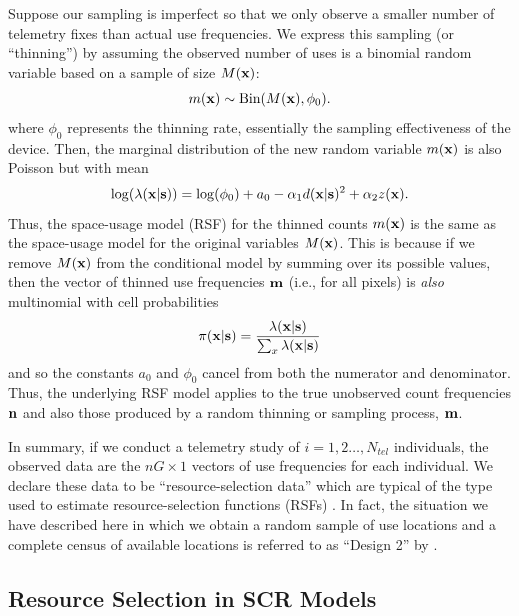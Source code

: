 \documentclass[12pt]{article}
\begin{document}
Suppose our sampling is imperfect so that we only observe a smaller
number of telemetry fixes than actual use
frequencies.
We express this sampling (or ``thinning'') by assuming the observed number of
uses is a binomial random variable based on a sample of size $M({\bf
  x})$:
\[
 m({\bf x}) \sim \mbox{Bin}(M({\bf x}), \phi_{0}).
\]
where $\phi_{0}$
represents the thinning rate, essentially the
sampling effectiveness of the device.
 Then, the marginal distribution of the new random variable $m({\bf x})$ is
 also Poisson
but with mean
\[
 \log(\lambda({\bf x}|{\bf s})) = \log(\phi_{0}) + a_{0} -\alpha_{1}
 d({\bf x}|{\bf s})^{2} +  \alpha_{2} z({\bf x}).
\]
 Thus, the space-usage model (RSF) for the
thinned counts $m({\bf x})$ is the same as the space-usage model for the
original variables $M({\bf x})$.  This is because if we remove $M({\bf
x})$
from the conditional
 model by summing over its possible values, then the vector of thinned
 use frequencies
${\bf m}$ (i.e., for all pixels) is {\it also}  multinomial with cell probabilities
\[
\pi({\bf x}|{\bf s}) = \frac{\lambda({\bf x}|{\bf s})}{\sum_{x}  \lambda({\bf x}|{\bf s})}
\]
and so the constants $a_{0}$ and $\phi_{0}$
cancel from both the numerator and
denominator. Thus, the underlying RSF model applies to the true
unobserved count frequencies ${\bf n}$ and also those produced
by a random thinning or sampling process, ${\bf m}$.

In summary, if we conduct a telemetry study of $i=1,2\ldots,N_{tel}$
individuals, the observed data are
the $nG \times 1$  vectors of use frequencies
for each individual.
 We declare these data to be
``resource-selection data'' which are typical of the type used to
estimate resource-selection functions (RSFs) \citep{manly_etal:2002}.
In fact, the situation we have described here in which
we obtain a random sample
of use locations and a complete census of available locations is
referred to as ``Design 2'' by \citep{manly_etal:2002}.



\subsection{Resource Selection in SCR Models}
\end{document}
